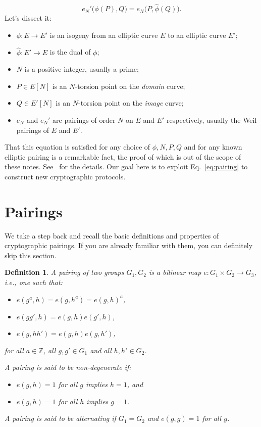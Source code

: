 \documentclass{article}
\newtheorem{defi}{Definition}
\def\Z{\mathbb{Z}}
\begin{document}
\begin{equation}
  \label{eq:pairing}
  e_N'\bigl(\phi(P), Q\bigr) = e_N\bigl(P, \hat\phi(Q)\bigr).
\end{equation}
%
Let's dissect it:
%
\begin{itemize}
\item $\phi: E\to E'$ is an isogeny from an elliptic curve $E$ to an
  elliptic curve $E'$;
\item $\hat\phi: E'\to E$ is the dual of $\phi$;
\item $N$ is a positive integer, usually a prime;
\item $P\in E[N]$ is an $N$-torsion point on the \emph{domain} curve;
\item $Q\in E'[N]$ is an $N$-torsion point on the \emph{image} curve;
\item $e_N$ and $e_N'$ are pairings of order $N$ on $E$ and $E'$
  respectively, usually the Weil pairings of $E$ and $E'$.
\end{itemize}

That this equation is satisfied for any choice of $\phi,N,P,Q$ and for
any known elliptic pairing is a remarkable fact, the proof of which is
out of the scope of these notes.
See~\cite[\S~III.8]{silverman:elliptic} for the details.  Our goal
here is to exploit Eq.~\eqref{eq:pairing} to construct new
cryptographic protocols.


\section{Pairings}

We take a step back and recall the basic definitions and properties of
cryptographic pairings.  If you are already familiar with them, you
can definitely skip this section.

\begin{defi}
  A pairing of two groups $G_1,G_2$ is a bilinear map
  $e:G_1\times G_2\to G_3$, i.e., one such that:
  \begin{itemize}
  \item $e(g^a,h) = e(g,h^a) = e(g,h)^a$,
  \item $e(gg', h) = e(g,h)e(g',h)$,
  \item $e(g,hh') = e(g,h)e(g,h')$,
  \end{itemize}
  for all $a\in\Z$, all $g,g'\in G_1$ and all $h,h'\in G_2$.

  A pairing is said to be \emph{non-degenerate} if:
  \begin{itemize}
  \item $e(g,h)=1$ for all $g$ implies $h=1$, and
  \item $e(g,h)=1$ for all $h$ implies $g=1$.
  \end{itemize}

  A pairing is said to be \emph{alternating} if $G_1=G_2$ and
  $e(g,g)=1$ for all $g$.
\end{defi}
\end{document}
